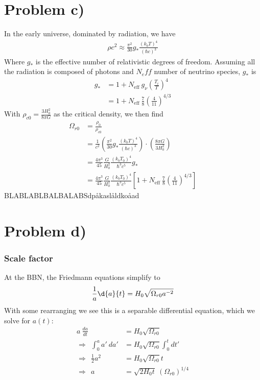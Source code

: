 \documentclass[reprint,english,notitlepage]{revtex4-1}  %
\numberwithin{equation}{section}
\begin{document}
\section{Problem c)}
In the early universe, dominated by radiation, we have
\begin{align}
	\rho c^2 \approx \frac{\pi^2}{30} g_* \frac{(k_b T)^4}{(\hbar c)^3}
\end{align}
Where $g_*$ is the effective number of relativistic degrees of freedom. Assuming
all the radiation is composed of photons and $N_eff$ number of neutrino species,
$g_*$ is
\begin{align}
	g_* &= 1 + N_{\mathrm{eff}}\ g_\nu	\left( \frac{T_i}{T} \right)^4 \\ %
	    &= 1 + N_{\mathrm{eff}}\ \frac{7}{8}	\left(\frac{4}{11}\right)^{4/3}
\end{align}
With $\rho_{c0}=\frac{3H_0^2}{8\pi G}$ as the critical density, we then find
\begin{align}
	\Omega_{r0} &= \frac{\rho_{0}}{\rho_{c0}} \\
							&= \frac{1}{c^2} \left(\frac{\pi^2}{30} g_*
								\frac{(k_b T)^4}{(\hbar c)^3  }\right)\cdot
								\left({\frac{8\pi G}{3H_0^2}}\right) \\
							&= \frac{4\pi^3}{45}\frac{G}{H_0^2}\frac{(k_b T_0)^4}{\hbar^3 c^5}
								g_* \\
							&= \frac{4\pi^3}{45}\frac{G}{H_0^2}\frac{(k_b T_0)^4}{\hbar^3 c^5}
								\left[1 + N_{\mathrm{eff}}\ \frac{7}{8}	\left(\frac{4}{11}\right)^{4/3}\right]
\end{align}
BLABLABLBALBALABSdpåkaslåldkoåad

\section{Problem d)}
\subsubsection{Scale factor}
At the BBN, the Friedmann equations simplify to
\begin{align}
	\frac{1}{a} \d{a}{t} = H_0 \sqrt{\Omega_{r0}a^{-2}}
\end{align}
With some rearranging we see this is a separable differential equation, which
we solve for $a(t)$:
\begin{align}
					 			 a\ \frac{da}{dt} &= H_0 \sqrt{\Omega_{r0}}\ \\
	\Rightarrow\ \ \int_0^a a'\ da' &= H_0 \sqrt{\Omega_{r0}} \int_0^t dt' \\
	\Rightarrow\ \   \frac{1}{2}a^2 &= H_0\sqrt{\Omega_{r0}}t \\
	\Rightarrow\ \ 	  				    a &= \sqrt{2 H_0 t}\  \left(\Omega_{r0}\right)^{1/4}
	\label{eq:a(t)}
\end{align}
\end{document}
